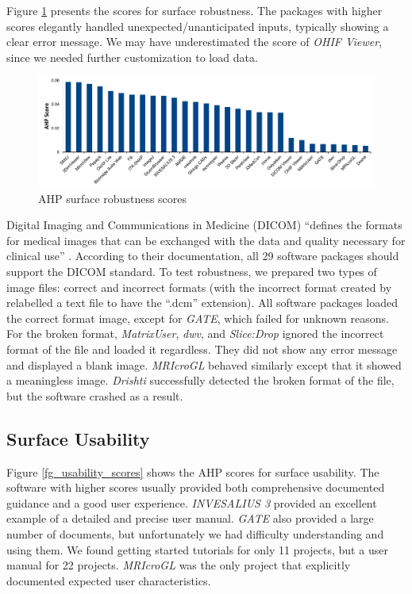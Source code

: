 \documentclass[final, 3p, times, authoryear]{elsarticle}
\begin{document}
Figure \ref{fg_robustness_scores} presents the scores for surface robustness.
The packages with higher scores elegantly handled unexpected/unanticipated
inputs, typically showing a clear error message. We may have underestimated the
score of \textit{OHIF Viewer}, since we needed further customization to load
data.

\begin{figure}[!ht]
\includegraphics[scale=0.48]{figures/robustness_scores.pdf}
\caption{AHP surface robustness scores}
\label{fg_robustness_scores}
\end{figure}

Digital Imaging and Communications in Medicine (DICOM) ``defines the formats for
medical images that can be exchanged with the data and quality necessary for
clinical use'' \citep{MITA2021}. According to their documentation, all 29
software packages should support the DICOM standard. To test robustness, we
prepared two types of image files: correct and incorrect formats (with the
incorrect format created by relabelled a text file to have the ``.dcm''
extension).  All software packages loaded the correct format image, except for
\textit{GATE}, which failed for unknown reasons.  For the broken format,
\textit{MatrixUser}, \textit{dwv}, and \textit{Slice:Drop} ignored the incorrect
format of the file and loaded it regardless. They did not show any error message
and displayed a blank image. \textit{MRIcroGL} behaved similarly except that it
showed a meaningless image. \textit{Drishti} successfully detected the broken
format of the file, but the software crashed as a result.

\subsection{Surface Usability} \label{sec_result_usability}

Figure \ref{fg_usability_scores} shows the AHP scores for surface usability. The
software with higher scores usually provided both comprehensive documented
guidance and a good user experience. \textit{INVESALIUS 3} provided an excellent
example of a detailed and precise user manual. \textit{GATE} also provided a
large number of documents, but unfortunately we had difficulty understanding and
using them. We found getting started tutorials for only 11 projects, but a user
manual for 22 projects. \textit{MRIcroGL} was the only project that explicitly
documented expected user characteristics.
\end{document}
